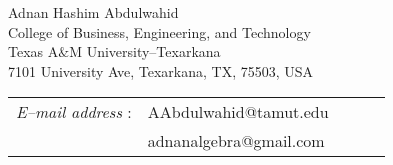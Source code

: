 \documentclass[11pt]{amsart}
\theoremstyle{remark}
\theoremstyle{definition}
\theoremstyle{remark}
\numberwithin{equation}{section}
\begin{document}
\vspace{.4cm}

\vspace*{3mm} 
\begin{flushright}
\begin{minipage}{148mm}\sc\footnotesize
	
	Adnan Hashim Abdulwahid\\
	College of Business, Engineering, and Technology \\
	Texas A$\&$M University--Texarkana\\
	7101 University Ave, Texarkana, TX, 75503,  USA
	
	{\tt \begin{tabular}{lllll}
			{\it E--mail address} :	&  {\color{blue}
				AAbdulwahid@tamut.edu}\\
			&  {\color{blue} adnanalgebra@gmail.com}\\
	\end{tabular} }\vspace*{3mm}
	
	\vspace{.2cm}
\end{minipage}
\end{flushright}
\end{document}
